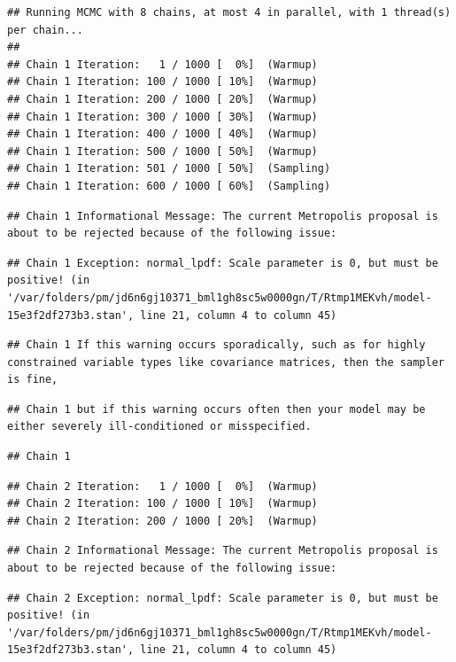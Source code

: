 \documentclass[
]{book}
\begin{document}
\begin{verbatim}
## Running MCMC with 8 chains, at most 4 in parallel, with 1 thread(s) per chain...
## 
## Chain 1 Iteration:   1 / 1000 [  0%]  (Warmup) 
## Chain 1 Iteration: 100 / 1000 [ 10%]  (Warmup) 
## Chain 1 Iteration: 200 / 1000 [ 20%]  (Warmup) 
## Chain 1 Iteration: 300 / 1000 [ 30%]  (Warmup) 
## Chain 1 Iteration: 400 / 1000 [ 40%]  (Warmup) 
## Chain 1 Iteration: 500 / 1000 [ 50%]  (Warmup) 
## Chain 1 Iteration: 501 / 1000 [ 50%]  (Sampling) 
## Chain 1 Iteration: 600 / 1000 [ 60%]  (Sampling)
\end{verbatim}

\begin{verbatim}
## Chain 1 Informational Message: The current Metropolis proposal is about to be rejected because of the following issue:
\end{verbatim}

\begin{verbatim}
## Chain 1 Exception: normal_lpdf: Scale parameter is 0, but must be positive! (in '/var/folders/pm/jd6n6gj10371_bml1gh8sc5w0000gn/T/Rtmp1MEKvh/model-15e3f2df273b3.stan', line 21, column 4 to column 45)
\end{verbatim}

\begin{verbatim}
## Chain 1 If this warning occurs sporadically, such as for highly constrained variable types like covariance matrices, then the sampler is fine,
\end{verbatim}

\begin{verbatim}
## Chain 1 but if this warning occurs often then your model may be either severely ill-conditioned or misspecified.
\end{verbatim}

\begin{verbatim}
## Chain 1
\end{verbatim}

\begin{verbatim}
## Chain 2 Iteration:   1 / 1000 [  0%]  (Warmup) 
## Chain 2 Iteration: 100 / 1000 [ 10%]  (Warmup) 
## Chain 2 Iteration: 200 / 1000 [ 20%]  (Warmup)
\end{verbatim}

\begin{verbatim}
## Chain 2 Informational Message: The current Metropolis proposal is about to be rejected because of the following issue:
\end{verbatim}

\begin{verbatim}
## Chain 2 Exception: normal_lpdf: Scale parameter is 0, but must be positive! (in '/var/folders/pm/jd6n6gj10371_bml1gh8sc5w0000gn/T/Rtmp1MEKvh/model-15e3f2df273b3.stan', line 21, column 4 to column 45)
\end{verbatim}
\end{document}

